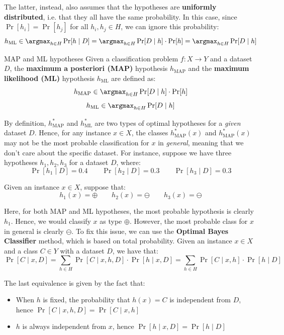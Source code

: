 \documentclass[a4paper, 12pt]{report}
\begin{document}
    The latter, instead, also assumes that the hypotheses are \textbf{uniformly distributed}, i.e. that they all have the same probability. In this case, since $\Pr[h_i] = \Pr[h_j]$ for all $h_i,h_j \in H$, we can ignore this probability:
    \[h_{\mathrm{ML}} \in \argmax_{h \in H} \Pr[h \mid D] = \argmax_{h \in H} \Pr[D \mid h] \cdot \Pr[h] = \argmax_{h \in H} \Pr[D \mid h]\]

    \begin{frameddefn}{MAP and ML hypotheses}
        Given a classification problem $f : X \to Y$ and a dataset $D$, the \textbf{maximum a posteriori (MAP)} hypothesis $h_{\mathrm{MAP}}$ and the  \textbf{maximum likelihood (ML)} hypothesis $h_{\mathrm{ML}}$ are defined as:
        \[h_{\mathrm{MAP}} \in \argmax_{h \in H} \Pr[D \mid h] \cdot \Pr[h]\]
        \[h_{\mathrm{ML}} \in \argmax_{h \in H} \Pr[D \mid h]\]
\end{frameddefn}

    By definition, $h_{\mathrm{MAP}}^*$ and $h_{\mathrm{ML}}^*$ are two types of optimal hypotheses for a \textit{given} dataset $D$. Hence, for any instance $x \in X$, the classes $h^*_{\mathrm{MAP}}(x)$ and $h^*_{\mathrm{MAP}}(x)$ may not be the most probable classification for $x$ in \textit{general}, meaning that we don't care about the specific dataset. For instance, suppose we have three hypotheses $h_1, h_2, h_3$ for a dataset $D$, where:
    \[\Pr[h_1 \mid D] = 0.4 \qquad \Pr[h_2 \mid D] = 0.3 \qquad \Pr[h_3 \mid D] = 0.3\]
    
    Given an instance $x \in X$, suppose that:
    \[h_1(x) = \oplus \qquad h_2(x) = \ominus \qquad h_3(x) = \ominus\]

    Here, for both MAP and ML hypotheses, the most probable hypothesis is clearly $h_1$. Hence, we would classify $x$ as type $\oplus$. However, the most probable class for $x$ in general is clearly $\ominus$. To fix this issue, we can use the \textbf{Optimal Bayes Classifier} method, which is based on total probability. Given an instance $x \in X$ and a class $C \in Y$ with a dataset $D$, we have that:
    \[\Pr[C \mid x, D] = \sum_{h \in H} \Pr[C \mid x,h,D] \cdot \Pr[h \mid x,D] = \sum_{h \in H} \Pr[C \mid x,h] \cdot \Pr[h \mid D]\]

    The last equivalence is given by the fact that:
    \begin{itemize}
        \item When $h$ is fixed, the probability that $h(x) = C$ is independent from $D$, hence $\Pr[C \mid x,h,D] = \Pr[C \mid x,h]$
        \item $h$ is always independent from $x$, hence $\Pr[h \mid x,D] = \Pr[h \mid D]$
    \end{itemize}
    
\end{document}
